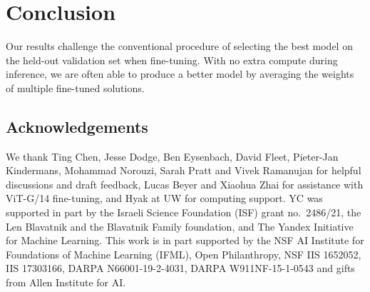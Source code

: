 \documentclass[nohyperref]{article}
\theoremstyle{plain}
\theoremstyle{definition}
\theoremstyle{remark}
\begin{document}
        \vspace{-0.5em}
        \section{Conclusion}
        \vspace{-0.25em}
        Our results challenge the conventional procedure of selecting the best model on the held-out validation set when fine-tuning.
        With no extra compute during inference, we are often able to produce a better model
        by
        averaging the weights of multiple fine-tuned solutions.
    
    \subsection*{Acknowledgements}
    {
    We thank
    Ting Chen, Jesse Dodge, Ben Eysenbach, David Fleet, Pieter-Jan Kindermans, Mohammad Norouzi, Sarah Pratt and Vivek Ramanujan for helpful discussions and draft feedback, Lucas Beyer and Xiaohua Zhai for assistance with ViT-G/14 fine-tuning, 
    and Hyak at UW for computing support. 
    YC was supported in part by the Israeli Science Foundation (ISF) grant no.\ 2486/21, the Len Blavatnik and the Blavatnik Family foundation, and The Yandex Initiative for Machine Learning.
    This work is in part supported by the NSF AI Institute for Foundations of Machine Learning (IFML), Open Philanthropy, NSF IIS 1652052, IIS 17303166, DARPA N66001-19-2-4031, DARPA W911NF-15-1-0543 and gifts from Allen Institute for AI.
    }
    {\small
    
    
    }
    
    
    \newpage
    \onecolumn
    \appendix
\end{document}
